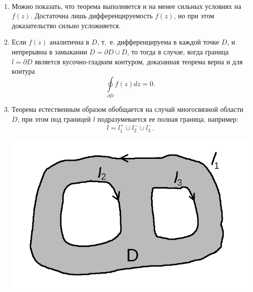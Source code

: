 \documentclass[../../main.tex]{subfiles}
\begin{document}
\begin{rems}
	\
\begin{enumerate}
		\item Можно показать, что теорема выполняется и на менее сильных
			условиях на $f(z)$. Достаточна лишь дифференцируемость $f(z)$,
			но при этом доказательство сильно усложняется.
		\item Если $f(z)$ аналитична в $D$, т.~е. дифференцируема в каждой
			точке $D$, и непрерывна в замыкании $D = \partial D \cup D$,
			то тогда в случае, когда граница $ l = \partial D$ является
			кусочно-гладким контуром, доказанная теорема верна и для
			контура
			\[ \oint\limits_{\partial D} f(z) dz = 0. \]
		\item Теорема естественным образом обобщается на случай
			многосвязной области $D$, при этом под границей $l$
			подразумевается ее полная граница, например:
			\[ l = l_1^+ \cup l_2^- \cup l_3^-.\]
			\begin{center}
			\includegraphics[scale = 0.3]{lec31_1.png}
			\end{center}
\end{enumerate}
\end{rems}
\end{document}
